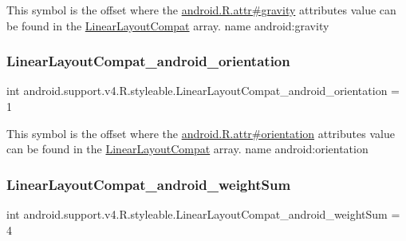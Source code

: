 This symbol is the offset where the \hyperlink{}{android.\+R.\+attr\#gravity} attribute\textquotesingle{}s value can be found in the \hyperlink{classandroid_1_1support_1_1v4_1_1R_1_1styleable_a5410acb05d349e2b35bd2dbadc93b229}{Linear\+Layout\+Compat} array.  name android\+:gravity \mbox{\label{classandroid_1_1support_1_1v4_1_1R_1_1styleable_a5b67b845c7e37a891973d4715fc0baeb}} 
\subsubsection{\texorpdfstring{Linear\+Layout\+Compat\+\_\+android\+\_\+orientation}{LinearLayoutCompat\_android\_orientation}}
{\footnotesize\ttfamily int android.\+support.\+v4.\+R.\+styleable.\+Linear\+Layout\+Compat\+\_\+android\+\_\+orientation = 1\hspace{0.3cm}{\ttfamily [static]}}

This symbol is the offset where the \hyperlink{}{android.\+R.\+attr\#orientation} attribute\textquotesingle{}s value can be found in the \hyperlink{classandroid_1_1support_1_1v4_1_1R_1_1styleable_a5410acb05d349e2b35bd2dbadc93b229}{Linear\+Layout\+Compat} array.  name android\+:orientation \mbox{\label{classandroid_1_1support_1_1v4_1_1R_1_1styleable_a60122618908d765ecf7a6397f21a692a}} 
\subsubsection{\texorpdfstring{Linear\+Layout\+Compat\+\_\+android\+\_\+weight\+Sum}{LinearLayoutCompat\_android\_weightSum}}
{\footnotesize\ttfamily int android.\+support.\+v4.\+R.\+styleable.\+Linear\+Layout\+Compat\+\_\+android\+\_\+weight\+Sum = 4\hspace{0.3cm}{\ttfamily [static]}}

